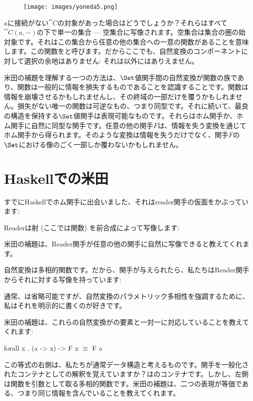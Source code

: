 \begin{figure}[H]
  \centering
  \texttt{[image: images/yoneda5.png]}
\end{figure}

\noindent
$a$に接続がない$\cat{C}$の対象があった場合はどうでしょうか？それらはすべて$\cat{C}(a, -)$の下で単一の集合 --- 空集合に写像されます。空集合は集合の圏の始対象です。それはこの集合から任意の他の集合への一意の関数があることを意味します。この関数をと呼びます。だからここでも、自然変換のコンポーネントに対して選択の余地はありません: それは以外にはありえません。

米田の補題を理解する一つの方法は、$\Set$値関手間の自然変換が関数の族であり、関数は一般的に情報を損失するものであることを認識することです。関数は情報を崩壊させるかもしれませんし、その終域の一部だけを覆うかもしれません。損失がない唯一の関数は可逆なもの、つまり同型です。それに続いて、最良の構造を保持する$\Set$値関手は表現可能なものです。それらはホム関手か、ホム関手に自然に同型な関手です。任意の他の関手$F$は、情報を失う変換を通じてホム関手から得られます。そのような変換は情報を失うだけでなく、関手$F$の$\Set$における像のごく一部しか覆わないかもしれません。

\section{Haskellでの米田}

すでにHaskellでホム関手に出会いました、それはreader関手の仮面をかぶっています: 

Readerは射 (ここでは関数) を前合成によって写像します: 

米田の補題は、Reader関手が任意の他の関手に自然に写像できると教えてくれます。

自然変換は多相的関数です。だから、関手が与えられたら、私たちはReader関手からそれに対する写像を持っています: 

通常、は省略可能ですが、自然変換のパラメトリック多相性を強調するために、私はそれを明示的に書くのが好きです。

米田の補題は、これらの自然変換がの要素と一対一に対応していることを教えてくれます: 

\begin{snipv}
forall x . (a -> x) -> F x \ensuremath{\cong} F a
\end{snipv}
この等式の右側は、私たちが通常データ構造と考えるものです。関手を一般化されたコンテナとしての解釈を覚えていますか？はのコンテナです。しかし、左側は関数を引数として取る多相的関数です。米田の補題は、二つの表現が等価である、つまり同じ情報を含んでいることを教えてくれます。

